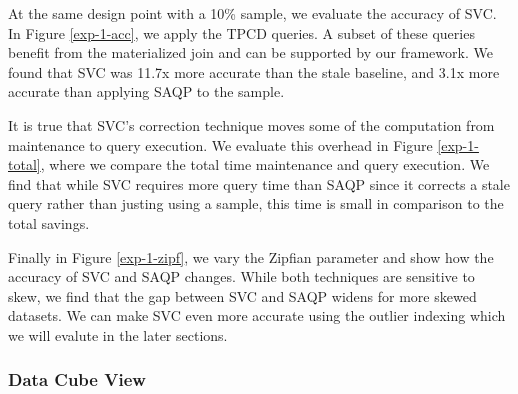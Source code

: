 At the same design point with a 10\% sample, we evaluate the accuracy of SVC.
In Figure \ref{exp-1-acc}, we apply the TPCD queries.
A subset of these queries benefit from the materialized join and can be supported by our framework.
We found that SVC was 11.7x more accurate than the stale baseline, and 3.1x more accurate than applying SAQP to the sample.

It is true that SVC's correction technique moves some of the computation from maintenance to query execution.
We evaluate this overhead in Figure \ref{exp-1-total}, where we compare the total time maintenance and query execution.
We find that while SVC requires more query time than SAQP since it corrects a stale query rather than justing using a sample, 
this time is small in comparison to the total savings. 

Finally in Figure \ref{exp-1-zipf}, we vary the Zipfian parameter and show how the accuracy of SVC and SAQP changes.
While both techniques are sensitive to skew, we find that the gap between SVC and SAQP widens for more skewed datasets.
We can make SVC even more accurate using the outlier indexing which we will evalute in the later sections.

\subsubsection{Data Cube View}

